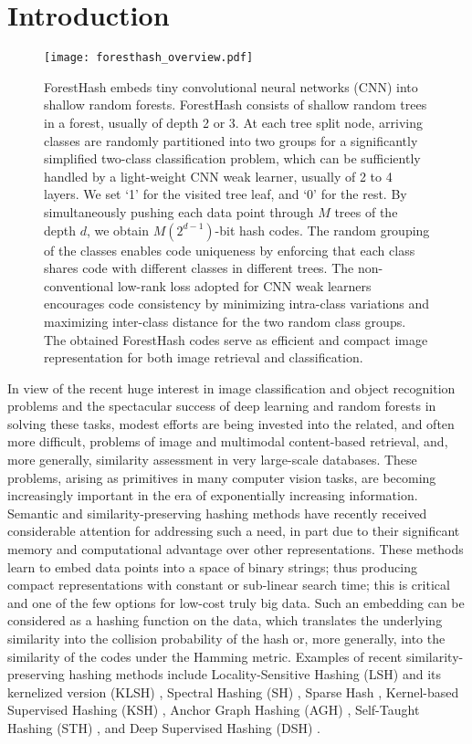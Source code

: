 \documentclass[runningheads]{llncs}
\begin{document}
\section{Introduction}
\label{sec:intr}


\begin{figure*}[t]
\centering
 \texttt{[image: foresthash\_overview.pdf]}
\caption{ForestHash embeds tiny convolutional neural networks (CNN) into shallow
  random forests. ForestHash consists of shallow random trees in a forest,
  usually of depth 2 or 3. At each tree split node, arriving classes are
  randomly partitioned into two groups for a significantly simplified two-class
  classification problem, which can be sufficiently handled by a light-weight
  CNN weak learner, usually of 2 to 4 layers.  We set ‘1’ for the visited tree
  leaf, and ‘0’ for the rest. By simultaneously pushing each data point through
  $M$ trees of the depth $d$, we obtain $M (2^{d-1})$-bit hash codes.  The
  random grouping of the classes enables code uniqueness by enforcing that each
  class shares code with different classes in different trees. The
  non-conventional low-rank loss adopted for CNN weak learners encourages code
  consistency by minimizing intra-class variations and maximizing inter-class
  distance for the two random class groups.  The obtained ForestHash codes serve
  as efficient and compact image representation for both image retrieval and
  classification.  }
\label{fig:overview}
\end{figure*}




In view of the recent huge interest in image classification and object
recognition problems and the spectacular success of deep learning and random
forests in solving these tasks,  modest 
efforts are being invested into the related, and often more difficult, problems
of image and multimodal content-based retrieval, and, more generally, similarity
assessment in very large-scale databases. These problems, arising as primitives
in many computer vision tasks, are becoming increasingly important in the era of
exponentially increasing information.  Semantic and similarity-preserving
hashing methods have recently received considerable attention for addressing
such a need, in part due to their significant memory and computational advantage
over other representations.  These methods learn to embed data points into a
space of binary strings; thus producing compact representations with constant or
sub-linear search time; this is critical and one of the few options for low-cost
truly big data.  Such an embedding can be considered as a hashing function on
the data, which translates the underlying similarity into the collision
probability of the hash or, more generally, into the similarity of the codes
under the Hamming metric.  Examples of recent similarity-preserving hashing
methods include Locality-Sensitive Hashing (LSH) \cite{LSH} and its kernelized
version (KLSH) \cite{KLSH}, Spectral Hashing (SH) \cite{SH}, Sparse Hash
\cite{sparsehash}, Kernel-based Supervised Hashing (KSH) \cite{KSH}, Anchor
Graph Hashing (AGH) \cite{AGH}, Self-Taught Hashing (STH) \cite{STH}, and Deep
Supervised Hashing (DSH) \cite{DSH}.
\end{document}
